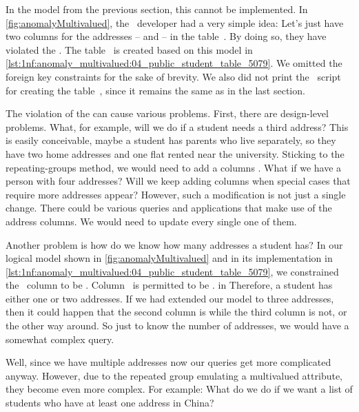 In the model from the previous section, this cannot be implemented.
In \cref{fig:anomalyMultivalued}, the \db\ developer had a very simple idea:
Let's just have two columns for the addresses --  and  -- in the table~.
By doing so, they have violated the .
The table~ is created based on this model in \cref{lst:1nf:anomaly_multivalued:04_public_student_table_5079}.
We omitted the foreign key  constraints for the sake of brevity.
We also did not print the \sql\ script for creating the table~, since it remains the same as in the last section.

The violation of the  can cause various problems.
First, there are design-level problems.
What, for example, will we do if a student needs a third address?
This is easily conceivable, maybe a student has parents who live separately, so they have two home addresses and one flat rented near the university.
Sticking to the repeating-groups method, we would need to add a columns .
What if we have a person with four addresses?
Will we keep adding columns when special cases that require more addresses appear?
However, such a modification is not just a single change.
There could be various queries and applications that make use of the address columns.
We would need to update every single one of them.

Another problem is how do we know how many addresses a student has?
In our logical model shown in \cref{fig:anomalyMultivalued} and in its implementation in \cref{lst:1nf:anomaly_multivalued:04_public_student_table_5079}, we constrained the ~column to be .
Column~ is permitted to be . in
Therefore, a student has either one or two addresses.
If we had extended our model to three addresses, then it could happen that the second column is  while the third column is not, or the other way around.
So just to know the number of addresses, we would have a somewhat complex query.

Well, since we have multiple addresses now our queries get more complicated anyway.
However, due to the repeated group emulating a multivalued attribute, they become even more complex.
For example:
What do we do if we want a list of students who have at least one address in China?

